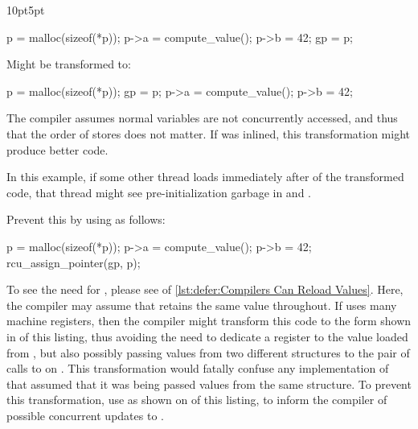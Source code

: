 \begin{listing}[tb]
\begin{adjustwidth}{10pt}{5pt}
\footnotesize
\renewcommand{\myfvline}{A\arabic{FancyVerbLine}}
\begin{fcvlabel}
\begin{VerbatimT}[commandchars=\\\[\]]
 p = malloc(sizeof(*p));		\lnlbl[A1]
 p->a = compute_value();		\lnlbl[A2]
 p->b = 42;				\lnlbl[A3]
 gp = p;				\lnlbl[A4]
\end{VerbatimT}
Might be transformed to:
\renewcommand{\myfvline}{B\arabic{FancyVerbLine}}
\begin{VerbatimT}[commandchars=\\\[\]]
 p = malloc(sizeof(*p));		\lnlbl[B1]
 gp = p;				\lnlbl[B2]
 p->a = compute_value();		\lnlbl[B3]
 p->b = 42;				\lnlbl[B4]
\end{VerbatimT}
The compiler assumes normal variables are not concurrently accessed,
and thus that the order of stores does not matter.
If  was inlined, this transformation might produce
better code.
\begin{fcvref}
In this example, if some other thread loads  immediately after
 of the transformed code, that thread might see
pre-initialization garbage in  and .
\end{fcvref}
Prevent this by using  as follows:
\renewcommand{\myfvline}{C\arabic{FancyVerbLine}}
\begin{VerbatimT}[commandchars=\\\[\]]
 p = malloc(sizeof(*p));		\lnlbl[C1]
 p->a = compute_value();		\lnlbl[C2]
 p->b = 42;				\lnlbl[C3]
 rcu_assign_pointer(gp, p);		\lnlbl[C4]
\end{VerbatimT}
\end{fcvlabel}
\end{adjustwidth}
\caption{Compilers Can Reorder Accesses}
\label{lst:defer:Compilers Can Reorder Accesses}
\end{listing}

\begin{fcvref}
To see the need for , please see
 of
\cref{lst:defer:Compilers Can Reload Values}.
Here, the compiler may assume that  retains the same value
throughout.
If  uses many machine registers, then the
compiler might transform this code to the form shown in
 of
this listing, thus avoiding the need to dedicate a register to the value
loaded from , but also possibly passing values from two
different structures to the pair of calls to 
on .
This transformation would fatally confuse any implementation of
 that assumed that it was being passed values
from the same structure.
To prevent this transformation, use  as shown on
 of this listing, to inform the compiler of possible
concurrent updates to .
\end{fcvref}

